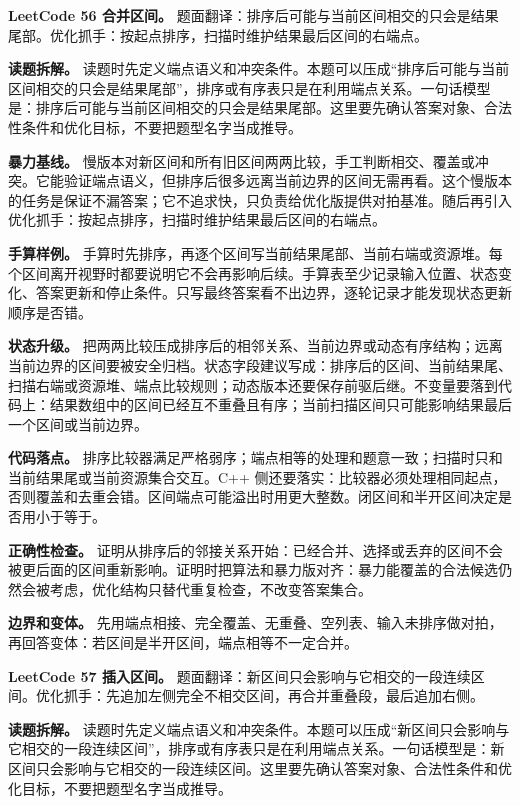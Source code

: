 \noindent\textbf{LeetCode 56 合并区间。} 题面翻译：排序后可能与当前区间相交的只会是结果尾部。优化抓手：按起点排序，扫描时维护结果最后区间的右端点。

\textbf{读题拆解。} 读题时先定义端点语义和冲突条件。本题可以压成“排序后可能与当前区间相交的只会是结果尾部”，排序或有序表只是在利用端点关系。一句话模型是：排序后可能与当前区间相交的只会是结果尾部。这里要先确认答案对象、合法性条件和优化目标，不要把题型名字当成推导。

\textbf{暴力基线。} 慢版本对新区间和所有旧区间两两比较，手工判断相交、覆盖或冲突。它能验证端点语义，但排序后很多远离当前边界的区间无需再看。这个慢版本的任务是保证不漏答案；它不追求快，只负责给优化版提供对拍基准。随后再引入优化抓手：按起点排序，扫描时维护结果最后区间的右端点。

\textbf{手算样例。} 手算时先排序，再逐个区间写当前结果尾部、当前右端或资源堆。每个区间离开视野时都要说明它不会再影响后续。手算表至少记录输入位置、状态变化、答案更新和停止条件。只写最终答案看不出边界，逐轮记录才能发现状态更新顺序是否错。

\textbf{状态升级。} 把两两比较压成排序后的相邻关系、当前边界或动态有序结构；远离当前边界的区间要被安全归档。状态字段建议写成：排序后的区间、当前结果尾、扫描右端或资源堆、端点比较规则；动态版本还要保存前驱后继。不变量要落到代码上：结果数组中的区间已经互不重叠且有序；当前扫描区间只可能影响结果最后一个区间或当前边界。

\textbf{代码落点。} 排序比较器满足严格弱序；端点相等的处理和题意一致；扫描时只和当前结果尾或当前资源集合交互。C++ 侧还要落实：比较器必须处理相同起点，否则覆盖和去重会错。区间端点可能溢出时用更大整数。闭区间和半开区间决定是否用小于等于。

\textbf{正确性检查。} 证明从排序后的邻接关系开始：已经合并、选择或丢弃的区间不会被更后面的区间重新影响。证明时把算法和暴力版对齐：暴力能覆盖的合法候选仍然会被考虑，优化结构只替代重复检查，不改变答案集合。

\textbf{边界和变体。} 先用端点相接、完全覆盖、无重叠、空列表、输入未排序做对拍，再回答变体：若区间是半开区间，端点相等不一定合并。

\noindent\textbf{LeetCode 57 插入区间。} 题面翻译：新区间只会影响与它相交的一段连续区间。优化抓手：先追加左侧完全不相交区间，再合并重叠段，最后追加右侧。

\textbf{读题拆解。} 读题时先定义端点语义和冲突条件。本题可以压成“新区间只会影响与它相交的一段连续区间”，排序或有序表只是在利用端点关系。一句话模型是：新区间只会影响与它相交的一段连续区间。这里要先确认答案对象、合法性条件和优化目标，不要把题型名字当成推导。

